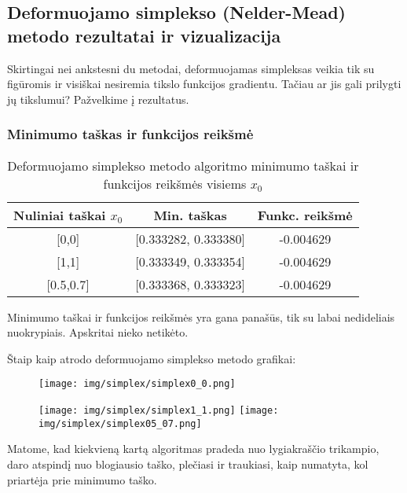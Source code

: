 \documentclass{article}
\begin{document}
\subsection{Deformuojamo simplekso (Nelder-Mead) metodo rezultatai ir vizualizacija}
Skirtingai nei ankstesni du metodai, deformuojamas simpleksas veikia tik su figūromis ir visiškai nesiremia tikslo funkcijos gradientu. Tačiau ar jis gali prilygti jų tikslumui? Pažvelkime į rezultatus.
\subsubsection{Minimumo taškas ir funkcijos reikšmė}
\begin{table}[H]
    \centering
    \begin{tabular}{|c|c|c|} 
    \hline
    Nuliniai taškai $x_{0}$ & Min. taškas            & Funkc. reikšmė  \\ 
    \hline
    {[}0,0]            & {[}0.333282, 0.333380] & -0.004629       \\ 
    \hline
    {[}1,1]            & {[}0.333349, 0.333354] & -0.004629       \\ 
    \hline
    {[}0.5,0.7]        & {[}0.333368, 0.333323] & -0.004629       \\
    \hline
    \end{tabular}
    \caption{Deformuojamo simplekso metodo algoritmo minimumo taškai ir funkcijos reikšmės visiems $x_{0}$}
    \label{table:10}
\end{table}
Minimumo taškai ir funkcijos reikšmės yra gana panašūs, tik su labai nedideliais nuokrypiais. Apskritai nieko netikėto.

Štaip kaip atrodo deformuojamo simplekso metodo grafikai:
\begin{figure}[H]
    \begin{adjustbox}{margin=0pt,center}
        \texttt{[image: img/simplex/simplex0\_0.png]}
    \end{adjustbox}
\end{figure}
\begin{figure}[H]
    \begin{adjustbox}{margin=0pt,center}
        \texttt{[image: img/simplex/simplex1\_1.png]}%
        \texttt{[image: img/simplex/simplex05\_07.png]}
    \end{adjustbox}
\end{figure}
Matome, kad kiekvieną kartą algoritmas pradeda nuo lygiakraščio trikampio, daro atspindį nuo blogiausio taško, plečiasi ir traukiasi, kaip numatyta, kol priartėja prie minimumo taško.
\end{document}
